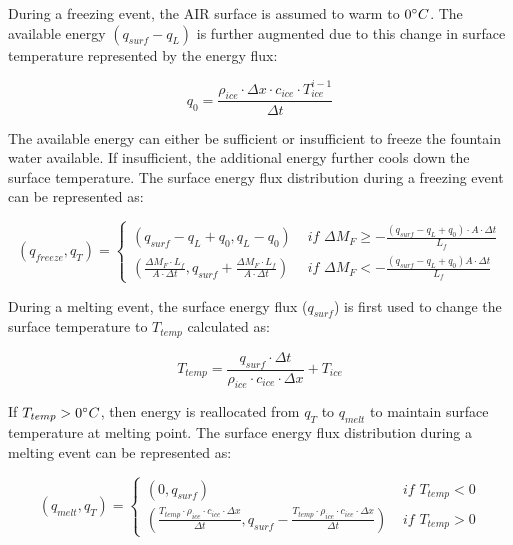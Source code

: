 \documentclass[utf8]{frontiersSCNS} %
\begin{document}
During a freezing event, the AIR surface is assumed to warm to $0 \degree C$. The available energy $(q_{surf}-q_{L})$ is
further augmented due to this change in surface temperature represented by the energy flux:

$$q_{0} = \frac{\rho_{ice} \cdot \Delta x \cdot c_{ice} \cdot T_{ice}^{i-1}}{\Delta t}$$

The available energy can either be sufficient or insufficient to freeze the fountain water available. If
insufficient, the additional energy further cools down the surface temperature. The surface energy flux
distribution during a freezing event can be represented as:

\begin{equation}
	(q_{freeze}, q_{T}) = \left\{ \begin{array}{ll}
		(q_{surf}-q_{L}+q_{0}, q_{L}-q_{0}) & \textit{ if } \Delta M_{F} \geq -\frac{(q_{surf}-q_{L}+q_{0}) \cdot A \cdot \Delta
		t}{L_f}                                                                                                                  \\
		(\frac{\Delta M_{F} \cdot L_f
		}{A \cdot \Delta t}
		, q_{surf}+\frac{\Delta M_{F} \cdot L_f
		}{A \cdot \Delta t})                & \textit{ if } \Delta M_{F} < -\frac{(q_{surf}-q_{L}+q_0) A \cdot \Delta
		t}{L_f}
	\end{array} \right.
\end{equation}

During a melting event, the surface energy flux ($q_{surf}$) is first used to change the surface temperature to
$T_{temp}$ calculated as:

\begin{equation} T_{temp} =\frac{q_{surf} \cdot \Delta t}{\rho_{ice} \cdot c_{ice} \cdot \Delta x} + T_{ice} \end{equation}

If $T_{temp} > 0 \degree C$, then energy is reallocated from $q_{T}$ to $q_{melt}$ to maintain surface temperature at
melting point. The surface energy flux distribution during a melting event can be represented as:

\begin{equation}
	(q_{melt}, q_{T}) = \left\{ \begin{array}{ll}
		(0, q_{surf})                                                                                                                                                 & \textit{ if } T_{temp} < 0 \\
		(\frac{T_{temp} \cdot \rho_{ice} \cdot c_{ice} \cdot \Delta x}{\Delta t}, q_{surf}-\frac{T_{temp} \cdot \rho_{ice} \cdot c_{ice} \cdot \Delta x}{\Delta t}  ) & \textit{ if } T_{temp} > 0
	\end{array} \right.
\end{equation}
\end{document}
